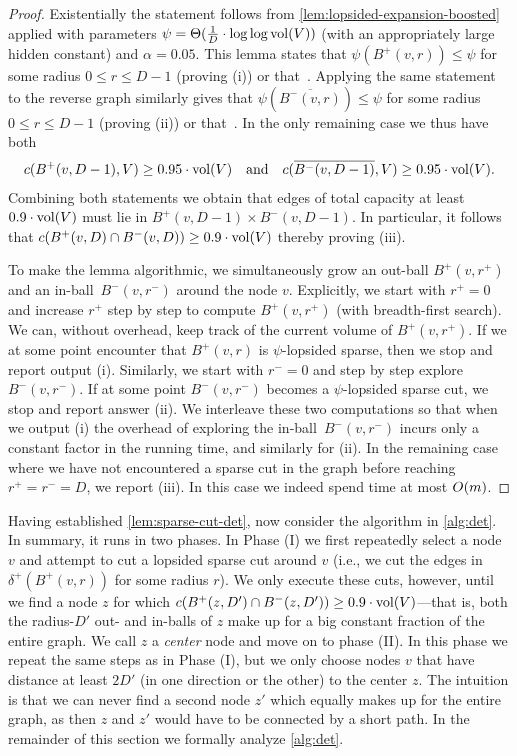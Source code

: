 \documentclass[letterpaper,11pt]{article}
\begin{document}
\begin{proof}
Existentially the statement follows from \cref{lem:lopsided-expansion-boosted} applied with parameters $\psi = \Theta(\frac{1}{D} \cdot \log\log \operatorname{vol}(V))$ (with an appropriately large hidden constant) and $\alpha = 0.05$. This lemma states that $\psi(B^+(v, r)) \leq \psi$ for some radius $0 \leq r \leq D - 1$ (proving (i)) or that~. Applying the same statement to the reverse graph similarly gives that $\psi(\overline{B^-(v, r)}) \leq \psi$ for some radius $0 \leq r \leq D - 1$ (proving (ii)) or that~. In the only remaining case we thus have both
\begin{align*}
	c(B^+(v, D - 1), V) \geq 0.95 \cdot \operatorname{vol}(V)\quad\text{and}\quad c(\overline{B^-(v, D - 1)}, V) \geq 0.95 \cdot \operatorname{vol}(V).
\end{align*}
Combining both statements we obtain that edges of total capacity at least $0.9 \cdot \operatorname{vol}(V)$ must lie in $B^+(v, D - 1) \times B^-(v, D - 1)$. In particular, it follows that $c(B^+(v, D) \cap B^-(v, D)) \geq 0.9 \cdot \operatorname{vol}(V)$ thereby proving (iii).

To make the lemma algorithmic, we simultaneously grow an out-ball $B^+(v, r^+)$ and an in-ball~$B^-(v, r^-)$ around the node $v$. Explicitly, we start with $r^+ = 0$ and increase $r^+$ step by step to compute $B^+(v, r^+)$ (with breadth-first search). We can, without overhead, keep track of the current volume of $B^+(v, r^+)$. If we at some point encounter that $B^+(v, r)$ is $\psi$-lopsided sparse, then we stop and report output (i). Similarly, we start with $r^- = 0$ and step by step explore $B^-(v, r^-)$. If at some point $B^-(v, r^-)$ becomes a $\psi$-lopsided sparse cut, we stop and report answer (ii). We interleave these two computations so that when we output (i) the overhead of exploring the in-ball~$B^-(v, r^-)$ incurs only a constant factor in the running time, and similarly for (ii). In the remaining case where we have not encountered a sparse cut in the graph before reaching $r^+ = r^- = D$, we report (iii). In this case we indeed spend time at most $O(m)$.
\end{proof}

Having established \cref{lem:sparse-cut-det}, now consider the algorithm in \cref{alg:det}. In summary, it runs in two phases. In Phase (I) we first repeatedly select a node $v$ and attempt to cut a lopsided sparse cut around $v$ (i.e., we cut the edges in $\delta^+(B^+(v, r))$ for some radius $r$). We only execute these cuts, however, until we find a node $z$ for which $c(B^+(z, D') \cap B^-(z, D')) \geq 0.9 \cdot \operatorname{vol}(V)$---that is, both the radius-$D'$ out- and in-balls of $z$ make up for a big constant fraction of the entire graph. We call $z$ a \emph{center} node and move on to phase (II). In this phase we repeat the same steps as in Phase (I), but we only choose nodes $v$ that have distance at least $2D'$ (in one direction or the other) to the center $z$. The intuition is that we can never find a second node $z'$ which equally makes up for the entire graph, as then $z$ and $z'$ would have to be connected by a short path. In the remainder of this section we formally analyze \cref{alg:det}.
\end{document}
